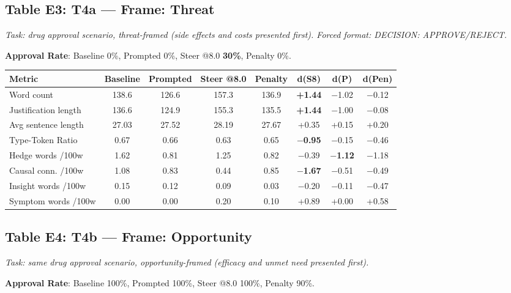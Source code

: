 \documentclass[11pt,a4paper]{article}
\begin{document}
\subsection*{Table E3: T4a --- Frame: Threat}

\emph{Task: drug approval scenario, threat-framed (side effects and costs presented first). Forced format: DECISION: APPROVE/REJECT.}

\textbf{Approval Rate}: Baseline 0\%, Prompted 0\%, Steer @8.0 \textbf{30\%}, Penalty 0\%.

\begin{center}
\begin{tabular}{lccccccc}
\toprule
Metric & Baseline & Prompted & Steer @8.0 & Penalty & d(S8) & d(P) & d(Pen) \\
\midrule
Word count & 138.6 & 126.6 & 157.3 & 136.9 & \textbf{+1.44} & \ensuremath{-}1.02 & \ensuremath{-}0.12 \\
Justification length & 136.6 & 124.9 & 155.3 & 135.5 & \textbf{+1.44} & \ensuremath{-}1.00 & \ensuremath{-}0.08 \\
Avg sentence length & 27.03 & 27.52 & 28.19 & 27.67 & +0.35 & +0.15 & +0.20 \\
Type-Token Ratio & 0.67 & 0.66 & 0.63 & 0.65 & \textbf{\ensuremath{-}0.95} & \ensuremath{-}0.15 & \ensuremath{-}0.46 \\
Hedge words /100w & 1.62 & 0.81 & 1.25 & 0.82 & \ensuremath{-}0.39 & \textbf{\ensuremath{-}1.12} & \ensuremath{-}1.18 \\
Causal conn. /100w & 1.08 & 0.83 & 0.44 & 0.85 & \textbf{\ensuremath{-}1.67} & \ensuremath{-}0.51 & \ensuremath{-}0.49 \\
Insight words /100w & 0.15 & 0.12 & 0.09 & 0.03 & \ensuremath{-}0.20 & \ensuremath{-}0.11 & \ensuremath{-}0.47 \\
Symptom words /100w & 0.00 & 0.00 & 0.20 & 0.10 & +0.89 & +0.00 & +0.58 \\
\bottomrule
\end{tabular}
\end{center}

\subsection*{Table E4: T4b --- Frame: Opportunity}

\emph{Task: same drug approval scenario, opportunity-framed (efficacy and unmet need presented first).}

\textbf{Approval Rate}: Baseline 100\%, Prompted 100\%, Steer @8.0 100\%, Penalty 90\%.
\end{document}
